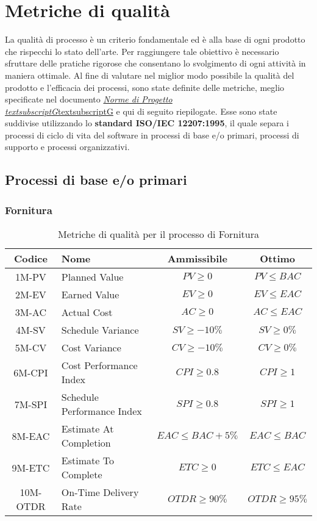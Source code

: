 \section{Metriche di qualità}
La qualità di processo è un criterio fondamentale ed è alla base di ogni prodotto che rispecchi lo stato dell'arte. Per raggiungere tale obiettivo è necessario sfruttare delle pratiche rigorose che consentano lo svolgimento di ogni attività in maniera ottimale. Al fine di valutare nel miglior modo possibile la qualità del prodotto e l'efficacia dei processi, sono state definite delle metriche, meglio specificate nel documento \href{https://7last.github.io/docs/rtb/documentazione-interna/glossario#norme-di-progetto}{\href{https://7last.github.io/docs/rtb/documentazione-interna/glossario\#norme-di-progetto}{\textit{Norme di Progetto\\textsubscript{G}}textsubscript{G}}} e qui di seguito riepilogate. Esse sono state suddivise utilizzando lo \textbf{standard ISO/IEC 12207:1995}, il quale separa i processi di ciclo di vita del software in processi di base e/o primari, processi di supporto e processi organizzativi.



\subsection{Processi di base e/o primari}
\subsubsection{Fornitura}
\begin{table}[h!]
	\centering
	\begin{tabular}{ | c | l | c | c | }
		\hline
		Codice   & Nome                       & Ammissibile          & Ottimo           \\
		\hline
		1M-PV    & Planned Value              & $PV \geq 0$          & $PV \leq BAC$    \\
		2M-EV    & Earned Value               & $EV \geq 0$          & $EV \leq EAC$    \\
		3M-AC    & Actual Cost                & $AC \geq 0$          & $AC \leq EAC$    \\
		4M-SV    & Schedule Variance          & $SV \geq -10\%$      & $SV \geq 0\%$    \\
		5M-CV    & Cost Variance              & $CV \geq -10\%$      & $CV \geq 0\%$    \\
		6M-CPI   & Cost Performance Index     & $CPI \geq 0.8$       & $CPI \geq 1$     \\
		7M-SPI   & Schedule Performance Index & $SPI \geq 0.8$       & $SPI \geq 1$     \\
		8M-EAC   & Estimate At Completion     & $EAC \leq BAC + 5\%$ & $EAC \leq BAC$   \\
		9M-ETC   & Estimate To Complete       & $ETC \geq 0$         & $ETC \leq EAC$   \\
		10M-OTDR & On-Time Delivery Rate      & $OTDR \geq 90\%$     & $OTDR \geq 95\%$ \\
		\hline
	\end{tabular}
	\caption{Metriche di qualità per il processo di Fornitura}
\end{table}

